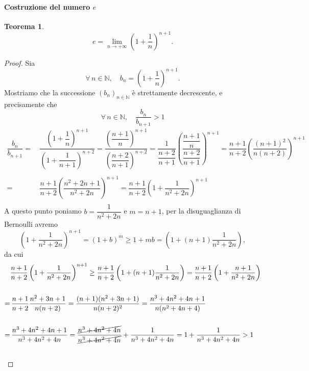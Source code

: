 \documentclass{article}
\theoremstyle{plain}
\newtheorem{thm}{Teorema}[section]
\theoremstyle{definition}
\theoremstyle{remark}
\begin{document}
\paragraph{Costruzione del numero $e$}
\begin{bxthm}
\begin{thm}
    \[e=\lim_{n\to+\infty}\left(1+\dfrac{1}{n}\right)^{n+1}.\]
\end{thm}
\end{bxthm}
\begin{proof}
    Sia \[\forall\, n\in\mathbb{N},\quad b_n=\left(1+\dfrac{1}{n}\right)^{n+1}.\]
    Mostriamo che la successione $(b_n)_{n\in\mathbb{N}}$ è strettamente decrescente, e precisamente che 
    \[\forall\, n\in\mathbb{N},\quad\dfrac{b_n}{b_{n+1}}>1\]
    \begin{align*}
        \dfrac{b_n}{b_{n+1}}=&\,\dfrac{\left(1+\dfrac{1}{n}\right)^{n+1}}{\left(1+\dfrac{1}{n+1}\right)^{n+2}}=\dfrac{\left(\dfrac{n+1}{n}\right)^{n+1}}{\left(\dfrac{n+2}{n+1}\right)^{n+2}}=\dfrac{1}{\dfrac{n+2}{n+1}}\left(\dfrac{\dfrac{n+1}{n}}{\dfrac{n+2}{n+1}}\right)^{n+1}=\dfrac{n+1}{n+2}\left(\dfrac{(n+1)^2}{n(n+2)}\right)^{n+1}\\\\
        =&\,\dfrac{n+1}{n+2}\left(\dfrac{n^2+2n+1}{n^2+2n}\right)^{n+1}=\dfrac{n+1}{n+2}\left(1+\dfrac{1}{n^2+2n}\right)^{n+1}\\
    \end{align*}
    A questo punto poniamo $b=\dfrac{1}{n^2+2n}$ e $m=n+1$, per la disuguaglianza di Bernoulli avremo
    \[\left(1+\dfrac{1}{n^2+2n}\right)^{n+1}=(1+b)^m\geq1+mb=\left(1+(n+1)\dfrac{1}{n^2+2n}\right),\]
    da cui
    \begin{align*}
        &\dfrac{n+1}{n+2}\left(1+\dfrac{1}{n^2+2n}\right)^{n+1}\geq\dfrac{n+1}{n+2}\left(1+(n+1)\dfrac{1}{n^2+2n}\right)=\dfrac{n+1}{n+2}\left(1+\dfrac{n+1}{n^2+2n}\right)\\\\
        =&\,\dfrac{n+1}{n+2}\dfrac{n^2+3n+1}{n(n+2)}=\dfrac{(n+1)(n^2+3n+1)}{n(n+2)^2}=\dfrac{n^3+4n^2+4n+1}{n(n^2+4n+4)}\\\\
        =&\,\dfrac{n^3+4n^2+4n+1}{n^3+4n^2+4n}=\dfrac{\cancel{n^3+4n^2+4n}}{\cancel{n^3+4n^2+4n}}+\dfrac{1}{n^3+4n^2+4n}=1+\dfrac{1}{n^3+4n^2+4n}>1\\\\
    \end{align*}
\end{proof}

\vspace{10pt}
\end{document}
